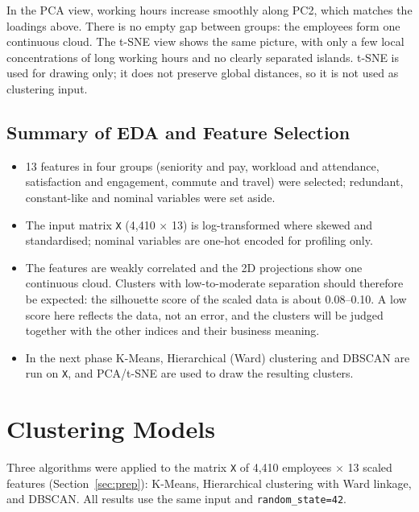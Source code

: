 \documentclass[12pt,a4paper]{article}
\begin{document}
In the PCA view, working hours increase smoothly along PC2, which matches the
loadings above. There is no empty gap between groups: the employees form one
continuous cloud. The t-SNE view shows the same picture, with only a few local
concentrations of long working hours and no clearly separated islands.
t-SNE is used for drawing only; it does not preserve global distances, so it is
not used as clustering input.

\subsection{Summary of EDA and Feature Selection}

\begin{itemize}
  \item 13 features in four groups (seniority and pay, workload and
  attendance, satisfaction and engagement, commute and travel) were selected;
  redundant, constant-like and nominal variables were set aside.
  \item The input matrix \texttt{X} (4,410 $\times$ 13) is log-transformed
  where skewed and standardised; nominal variables are one-hot encoded for
  profiling only.
  \item The features are weakly correlated and the 2D projections show one
  continuous cloud. Clusters with low-to-moderate separation should therefore be
  expected: the silhouette score of the scaled data is about 0.08--0.10. A low
  score here reflects the data, not an error, and the clusters will be judged
  together with the other indices and their business meaning.
  \item In the next phase K-Means, Hierarchical (Ward) clustering and DBSCAN are
  run on \texttt{X}, and PCA/t-SNE are used to draw the resulting clusters.
\end{itemize}

\section{Clustering Models}
\label{sec:models}

Three algorithms were applied to the matrix \texttt{X} of 4,410 employees
$\times$ 13 scaled features (Section~\ref{sec:prep}): K-Means,
Hierarchical clustering with Ward linkage, and DBSCAN. All results use the same
input and \texttt{random\_state=42}.
\end{document}
